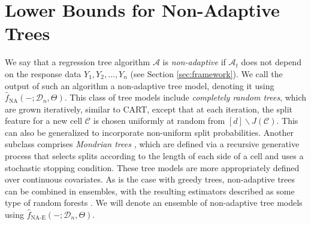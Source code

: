\documentclass[11pt]{article}
\newcommand{\cell}{\mathcal{C}}
\newcommand{\nfeats}{d}
\newcommand{\nsamples}{n}
\newcommand{\coordindices}{[\nfeats]}
\newcommand{\data}[1][n]{\mathcal{D}_{#1}}
\newcommand{\cellfeatindices}{J}
\newcommand{\fna}{\hat{f}_{\operatorname{NA}}}
\newcommand{\alg}{\mathcal{A}}
\newcommand{\fnae}{\hat f_{\operatorname{NA-E}}}
\begin{document}



\section{Lower Bounds for Non-Adaptive Trees}
\label{sec:non_adaptive_trees}

We say that a regression tree algorithm $\alg$ is \emph{non-adaptive} if $\alg_t$ does not depend on the response data $Y_1,Y_2,\ldots,Y_\nsamples$ (see Section \ref{sec:framework}).
We call the output of such an algorithm a non-adaptive tree model, denoting it using $\fna(-;\data,\Theta)$.
This class of tree models include \emph{completely random trees}, which are grown iteratively, similar to CART, except that at each iteration, the split feature for a new cell $\cell$ is chosen uniformly at random from $\coordindices\backslash\cellfeatindices(\cell)$.
This can also be generalized to incorporate non-uniform split probabilities.
Another subclass comprises \emph{Mondrian trees} \citep{roy2008mondrian}, which are defined via a recursive generative process that selects splits according to the length of each side of a cell and uses a stochastic stopping condition.
These tree models are more appropriately defined over continuous covariates.
As is the case with greedy trees, non-adaptive trees can be combined in ensembles, with the resulting estimators described as some type of random forests \citep{lakshminarayanan2014mondrian,biau2012analysis}.
We will denote an ensemble of non-adaptive tree models using $\fnae(-;\data,\Theta)$.
\end{document}

